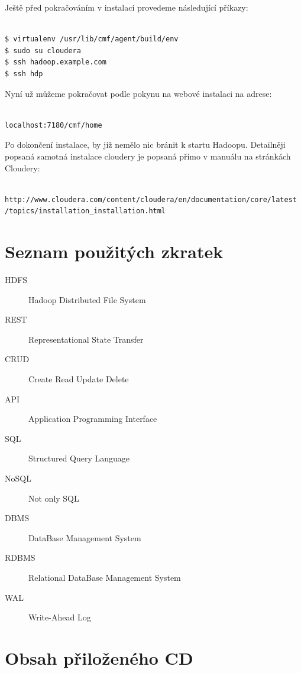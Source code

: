 \documentclass[thesis=M,czech]{FITthesis}[2012/06/26]
\begin{document}
Ještě před pokračováním v instalaci provedeme následující příkazy:
\begin{lstlisting}[frame=single]  % Start your code-block

$ virtualenv /usr/lib/cmf/agent/build/env
$ sudo su cloudera
$ ssh hadoop.example.com
$ ssh hdp
\end{lstlisting}

Nyní už můžeme pokračovat podle pokynu na webové instalaci na adrese:
\begin{lstlisting}[frame=single]  % Start your code-block

localhost:7180/cmf/home
\end{lstlisting}

Po dokončení instalace, by již nemělo nic bránit k startu Hadoopu. Detailněji popsaná samotná instalace cloudery je popsaná přímo v manuálu na stránkách Cloudery:
\begin{lstlisting}[frame=single]  % Start your code-block

http://www.cloudera.com/content/cloudera/en/documentation/core/latest /topics/installation_installation.html
\end{lstlisting}
\chapter{Seznam použitých zkratek}
\begin{description}
	\item[HDFS] Hadoop Distributed File System
	\item[REST] Representational State Transfer
	\item[CRUD] Create Read Update Delete
	\item[API] Application Programming Interface
	\item[SQL] Structured Query Language
	\item[NoSQL] Not only SQL
	\item[DBMS] DataBase Management System
	\item[RDBMS] Relational DataBase Management System
	\item[WAL] Write-Ahead Log
	

\end{description}


\chapter{Obsah přiloženého CD}


\begin{figure}
\end{figure}
\end{document}
